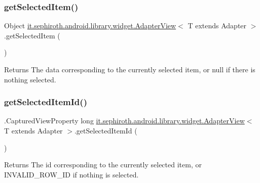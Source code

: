 \subsubsection{\texorpdfstring{get\+Selected\+Item()}{getSelectedItem()}}
{\footnotesize\ttfamily Object \hyperlink{classit_1_1sephiroth_1_1android_1_1library_1_1widget_1_1_adapter_view}{it.\+sephiroth.\+android.\+library.\+widget.\+Adapter\+View}$<$ T extends Adapter $>$.get\+Selected\+Item (\begin{DoxyParamCaption}{ }\end{DoxyParamCaption})}

\begin{DoxyReturn}{Returns}
The data corresponding to the currently selected item, or null if there is nothing selected. 
\end{DoxyReturn}
\mbox{\label{classit_1_1sephiroth_1_1android_1_1library_1_1widget_1_1_adapter_view_aea3946a289bf00833bbcc4f2281e1bf1}} 
\subsubsection{\texorpdfstring{get\+Selected\+Item\+Id()}{getSelectedItemId()}}
{\footnotesize\ttfamily .Captured\+View\+Property long \hyperlink{classit_1_1sephiroth_1_1android_1_1library_1_1widget_1_1_adapter_view}{it.\+sephiroth.\+android.\+library.\+widget.\+Adapter\+View}$<$ T extends Adapter $>$.get\+Selected\+Item\+Id (\begin{DoxyParamCaption}{ }\end{DoxyParamCaption})}

\begin{DoxyReturn}{Returns}
The id corresponding to the currently selected item, or I\+N\+V\+A\+L\+I\+D\+\_\+\+R\+O\+W\+\_\+\+ID if nothing is selected. 
\end{DoxyReturn}
\mbox{\label{classit_1_1sephiroth_1_1android_1_1library_1_1widget_1_1_adapter_view_abf31ea6d2bfb290c21ccaba39b1fa41d}} 

